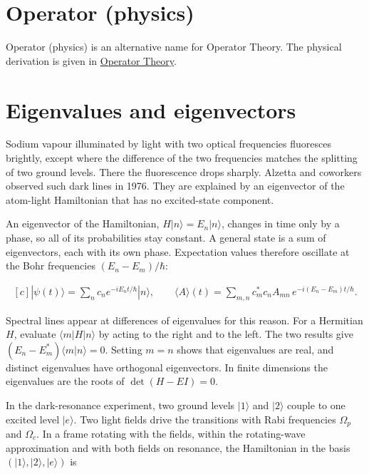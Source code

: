 \documentclass[11pt,oneside]{book}
\newenvironment{centeredalign}{\[\begin{gathered}[c]}{\end{gathered}\]}
\begin{document}
\clearpage
\section{Operator (physics)}
\label{topic:operator-physics}
Operator (physics) is an alternative name for Operator Theory.
The physical derivation is given in \hyperref[topic:operator-theory]{Operator Theory}.

\clearpage

\section{Eigenvalues and eigenvectors}

\label{topic:eigenvalues-and-eigenvectors}

Sodium vapour illuminated by light with two optical frequencies fluoresces brightly, except where the difference of the two frequencies matches the splitting of two ground levels. There the fluorescence drops sharply. Alzetta and coworkers observed such dark lines in 1976. They are explained by an eigenvector of the atom-light Hamiltonian that has no excited-state component.

An eigenvector of the Hamiltonian, \(H|n\rangle=E_n|n\rangle\), changes in time only by a phase, so all of its probabilities stay constant. A general state is a sum of eigenvectors, each with its own phase. Expectation values therefore oscillate at the Bohr frequencies \((E_n-E_m)/\hbar\):

\begin{centeredalign}
|\psi(t)\rangle=\sum_nc_ne^{-iE_nt/\hbar}|n\rangle,\qquad
\langle A\rangle(t)=\sum_{m,n}c_m^*c_nA_{mn}\,e^{-i(E_n-E_m)t/\hbar}.
\end{centeredalign}

Spectral lines appear at differences of eigenvalues for this reason. For a Hermitian \(H\), evaluate \(\langle m|H|n\rangle\) by acting to the right and to the left. The two results give \((E_n-E_m^*)\langle m|n\rangle=0\). Setting \(m=n\) shows that eigenvalues are real, and distinct eigenvalues have orthogonal eigenvectors. In finite dimensions the eigenvalues are the roots of \(\det(H-EI)=0\).

In the dark-resonance experiment, two ground levels \(|1\rangle\) and \(|2\rangle\) couple to one excited level \(|e\rangle\). Two light fields drive the transitions with Rabi frequencies \(\Omega_p\) and \(\Omega_c\). In a frame rotating with the fields, within the rotating-wave approximation and with both fields on resonance, the Hamiltonian in the basis \((|1\rangle,|2\rangle,|e\rangle)\) is
\end{document}
